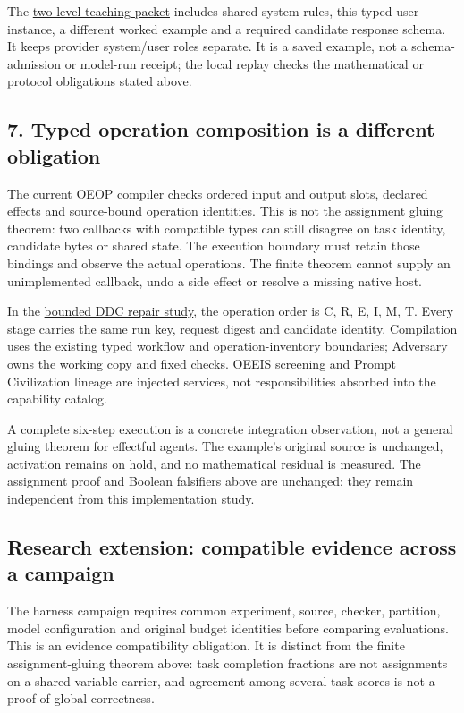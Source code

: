 \documentclass[
  11pt,
]{article}
\begin{document}
The \href{prompts/example.yaml}{two-level teaching packet} includes
shared system rules, this typed user instance, a different worked
example and a required candidate response schema. It keeps provider
system/user roles separate. It is a saved example, not a
schema-admission or model-run receipt; the local replay checks the
mathematical or protocol obligations stated above.

\subsection{7. Typed operation composition is a different
obligation}\label{typed-operation-composition-is-a-different-obligation}

The current OEOP compiler checks ordered input and output slots,
declared effects and source-bound operation identities. This is not the
assignment gluing theorem: two callbacks with compatible types can still
disagree on task identity, candidate bytes or shared state. The
execution boundary must retain those bindings and observe the actual
operations. The finite theorem cannot supply an unimplemented callback,
undo a side effect or resolve a missing native host.

In the \href{../028/paper.pdf}{bounded DDC repair study}, the operation
order is C, R, E, I, M, T. Every stage carries the same run key, request
digest and candidate identity. Compilation uses the existing typed
workflow and operation-inventory boundaries; Adversary owns the working
copy and fixed checks. OEEIS screening and Prompt Civilization lineage
are injected services, not responsibilities absorbed into the capability
catalog.

A complete six-step execution is a concrete integration observation, not
a general gluing theorem for effectful agents. The example's original
source is unchanged, activation remains on hold, and no mathematical
residual is measured. The assignment proof and Boolean falsifiers above
are unchanged; they remain independent from this implementation study.

\subsection{Research extension: compatible evidence across a
campaign}\label{research-extension-compatible-evidence-across-a-campaign}

The harness campaign requires common experiment, source, checker,
partition, model configuration and original budget identities before
comparing evaluations. This is an evidence compatibility obligation. It
is distinct from the finite assignment-gluing theorem above: task
completion fractions are not assignments on a shared variable carrier,
and agreement among several task scores is not a proof of global
correctness.
\end{document}
